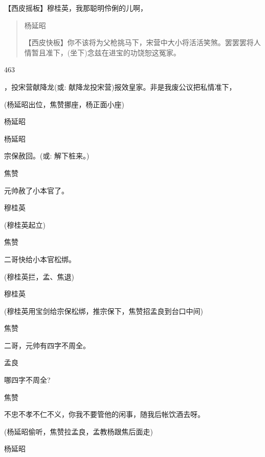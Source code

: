 {{【{\akai 西皮摇板}】穆桂英，我那聪明伶俐的儿啊，  \begin{quote}  杨延昭  

【{\akai 西皮快板}】你不该将为父枪挑马下，宋营中大小将活活笑煞。罢罢罢将人情暂且准下，(坐下)念兹在进宝的功饶恕这冤家。  \end{quote}  {463}}，投宋营献降龙({\akai 或}: 献降龙投宋营)报效皇家。非是我废公议把私情准下，

(杨延昭出位，焦赞挪座，杨正面小座)

杨延昭\hspace{20pt}~


杨延昭\hspace{20pt}~

宗保赦回。({\akai 或}: 解下桩来。)

焦赞\hspace{30pt}~

元帅赦了小本官了。

穆桂英\hspace{20pt}~


(穆桂英起立)

焦赞\hspace{30pt}~

二哥快给小本官松绑。

(穆桂英拦，孟、焦退)

穆桂英\hspace{20pt}~


(穆桂英用宝剑给宗保松绑，推宗保下，焦赞招孟良到台口中间)

焦赞\hspace{30pt}~

二哥，元帅有四字不周全。

孟良\hspace{30pt}~

哪四字不周全?

焦赞\hspace{30pt}~

不忠不孝不仁不义，你我不要管他的闲事，随我后帐饮酒去呀。

(杨延昭偷听，焦赞拉孟良，孟教杨跟焦后面走)

杨延昭\hspace{20pt}~

}
